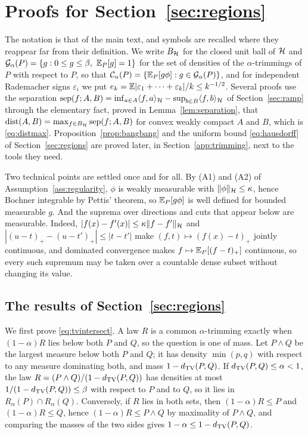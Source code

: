 \section{Proofs for Section~\ref{sec:regions}}
\label{app:regions}

The notation is that of the main text, and symbols are recalled where they reappear far from their definition. We
write $B_{\mathcal{H}}$ for the closed unit ball of $\mathcal{H}$ and $\mathcal G_\alpha(P)=\{g:0\le g\le\beta,\ \mathbb{E}_P[g]=1\}$ for the set
of densities of the $\alpha$-trimmings of $P$ with respect to $P$, so that
$\mathcal C_\alpha(P)=\{\mathbb{E}_P[g\phi]:g\in\mathcal G_\alpha(P)\}$, and for independent Rademacher signs $\varepsilon_i$
we put $e_k=\mathbb{E}|\varepsilon_1+\dots+\varepsilon_k|/k\le k^{-1/2}$. Several proofs use the separation
$\mathrm{sep}(f;A,B)=\inf_{a\in A}\langle f,a\rangle_{\mathcal{H}}-\sup_{b\in B}\langle f,b\rangle_{\mathcal{H}}$ of
Section~\ref{sec:ramp} through the elementary fact, proved in Lemma~\ref{lem:separation}, that
$\operatorname{dist}(A,B)=\max_{f\in B_{\mathcal{H}}}\mathrm{sep}(f;A,B)$ for convex weakly compact $A$ and $B$, which is \eqref{eq:distmax}.
Proposition~\ref{prop:bangbang} and the uniform bound \eqref{eq:hausdorff} of Section~\ref{sec:regions} are proved
later, in Section~\ref{app:trimming}, next to the tools they need.

Two technical points are settled once and for all. By (A1) and (A2) of Assumption~\ref{ass:regularity}, $\phi$ is
weakly measurable with $\|\phi\|_{\mathcal{H}}\le\kappa$, hence Bochner integrable by Pettis' theorem, so $\mathbb{E}_P[g\phi]$ is well
defined for bounded measurable $g$. And the suprema over directions and cuts that appear below are measurable. Indeed,
$|f(x)-f'(x)|\le\kappa\|f-f'\|_{\mathcal{H}}$ and $|(u-t)_+-(u-t')_+|\le|t-t'|$ make $(f,t)\mapsto(f(x)-t)_+$ jointly
continuous, and dominated convergence makes $f\mapsto\mathbb{E}_P[(f-t)_+]$ continuous, so every such supremum may be taken over
a countable dense subset without changing its value.

\subsection{The results of Section~\ref{sec:regions}}

We first prove \eqref{eq:tvintersect}. A law $R$ is a common $\alpha$-trimming exactly when $(1-\alpha)R$ lies below
both $P$ and $Q$, so the question is one of mass. Let $P\wedge Q$ be the largest measure below both $P$ and $Q$; it has
density $\min(p,q)$ with respect to any measure dominating both, and mass $1-d_{\mathrm{TV}}(P,Q)$. If $d_{\mathrm{TV}}(P,Q)\le\alpha<1$, the
law $R=(P\wedge Q)/(1-d_{\mathrm{TV}}(P,Q))$ has densities at most $1/(1-d_{\mathrm{TV}}(P,Q))\le\beta$ with respect to $P$ and to $Q$, so it
lies in $R_\alpha(P)\cap R_\alpha(Q)$. Conversely, if $R$ lies in both sets, then $(1-\alpha)R\le P$ and
$(1-\alpha)R\le Q$, hence $(1-\alpha)R\le P\wedge Q$ by maximality of $P\wedge Q$, and comparing the masses of the two
sides gives $1-\alpha\le1-d_{\mathrm{TV}}(P,Q)$.

